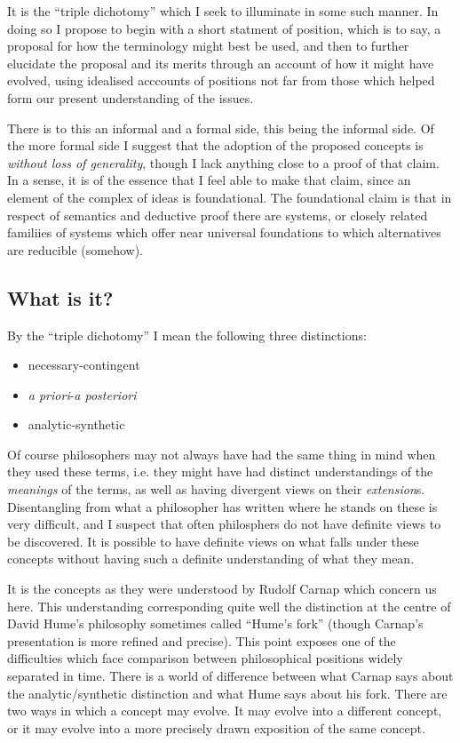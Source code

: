 \documentclass[10pt,titlepage]{article}
\begin{document}
It is the ``triple dichotomy'' which I seek to illuminate in some such manner.
In doing so I propose to begin with a short statment of position, which is to say, a proposal for how the terminology might best be used, and then to further elucidate the proposal and its merits through an account of how it might have evolved, using idealised acccounts of positions not far from those which helped form our present understanding of the issues.

There is to this an informal and a formal side, this being the informal side.
Of the more formal side I suggest that the adoption of the proposed concepts is \emph{without loss of generality}, though I lack anything close to a proof of that claim.
In a sense, it is of the essence that I feel able to make that claim, since an element of the complex of ideas is foundational.
The foundational claim is that in respect of semantics and deductive proof there are systems, or closely related familiies of systems which offer near universal foundations to which alternatives are reducible (somehow).


\subsection{What is it?}

By the ``triple dichotomy'' I mean the following three distinctions:

\begin{itemize}
\item necessary-contingent
\item \emph{a priori}-\emph{a posteriori}
\item analytic-synthetic
\end{itemize}

Of course philosophers may not always have had the same thing in mind when they used these terms,
i.e. they might have had distinct understandings of the \emph{meanings} of the terms, as well as having divergent views on their \emph{extension}s.
Disentangling from what a philosopher has written where he stands on these is very difficult, and I suspect that often philosphers do not have definite views to be discovered.
It is possible to have definite views on what falls under these concepts without having such a definite understanding of what they mean.

It is the concepts as they were understood by Rudolf Carnap which concern us here.
This understanding corresponding quite well the distinction at the centre of David Hume's philosophy sometimes called ``Hume's fork'' (though Carnap's presentation is more refined and precise).
This point exposes one of the difficulties which face comparison between philosophical positions widely separated in time.
There is a world of difference between what Carnap says about the analytic/synthetic distinction and what Hume says about his fork.
There are two ways in which a concept may evolve.
It may evolve into a different concept, or it may evolve into a more precisely drawn exposition of the same concept.
\end{document}
